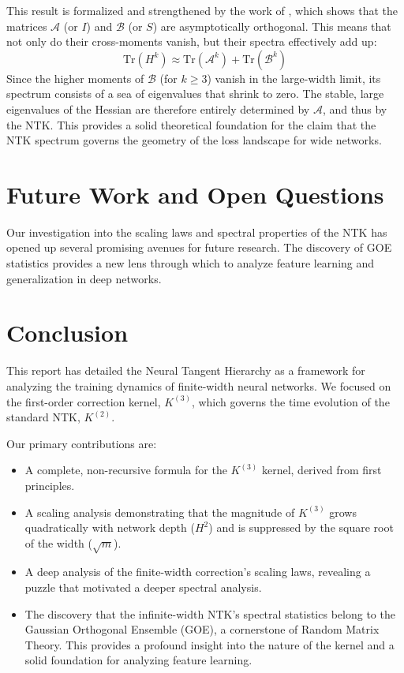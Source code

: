 \documentclass[a4paper]{article}
\begin{document}
This result is formalized and strengthened by the work of \cite{jacot2020kernelhessian}, which shows that the matrices $\mathcal{A}$ (or $I$) and $\mathcal{B}$ (or $S$) are asymptotically orthogonal. This means that not only do their cross-moments vanish, but their spectra effectively add up:
\begin{equation}
\mathrm{Tr}(H^k) \approx \mathrm{Tr}(\mathcal{A}^k) + \mathrm{Tr}(\mathcal{B}^k)
\end{equation}
Since the higher moments of $\mathcal{B}$ (for $k \ge 3$) vanish in the large-width limit, its spectrum consists of a sea of eigenvalues that shrink to zero. The stable, large eigenvalues of the Hessian are therefore entirely determined by $\mathcal{A}$, and thus by the NTK. This provides a solid theoretical foundation for the claim that the NTK spectrum governs the geometry of the loss landscape for wide networks.

\newpage
\section{Future Work and Open Questions}

Our investigation into the scaling laws and spectral properties of the NTK has opened up several promising avenues for future research. The discovery of GOE statistics provides a new lens through which to analyze feature learning and generalization in deep networks.

\newpage
\section{Conclusion}

This report has detailed the Neural Tangent Hierarchy as a framework for analyzing the training dynamics of finite-width neural networks. We focused on the first-order correction kernel, $K^{(3)}$, which governs the time evolution of the standard NTK, $K^{(2)}$.

Our primary contributions are:
\begin{itemize}
    \item A complete, non-recursive formula for the $K^{(3)}$ kernel, derived from first principles.
    \item A scaling analysis demonstrating that the magnitude of $K^{(3)}$ grows quadratically with network depth ($H^2$) and is suppressed by the square root of the width ($\sqrt{m}$).
    \item A deep analysis of the finite-width correction's scaling laws, revealing a puzzle that motivated a deeper spectral analysis.
    \item The discovery that the infinite-width NTK's spectral statistics belong to the Gaussian Orthogonal Ensemble (GOE), a cornerstone of Random Matrix Theory. This provides a profound insight into the nature of the kernel and a solid foundation for analyzing feature learning.
\end{itemize}
\end{document}

